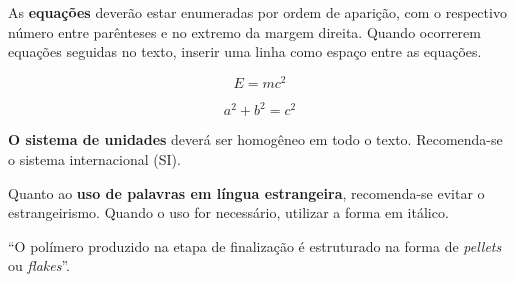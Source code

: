 As \textbf{equações} deverão estar enumeradas por ordem de aparição, com o respectivo número entre parênteses e no extremo da margem direita. Quando ocorrerem equações seguidas no texto, inserir uma linha como espaço entre as equações.

\begin{equation}
    E = mc^2
\end{equation}

\begin{equation}
    a^2 + b^2 = c^2
\end{equation}

\textbf{O sistema de unidades} deverá ser homogêneo em todo o texto. Recomenda-se o sistema internacional (SI).

Quanto ao \textbf{uso de palavras em língua estrangeira}, recomenda-se evitar o estrangeirismo. Quando o uso for necessário, utilizar a forma em itálico.

``O polímero produzido na etapa de finalização é estruturado na forma de \textit{pellets} ou \textit{flakes}''.
